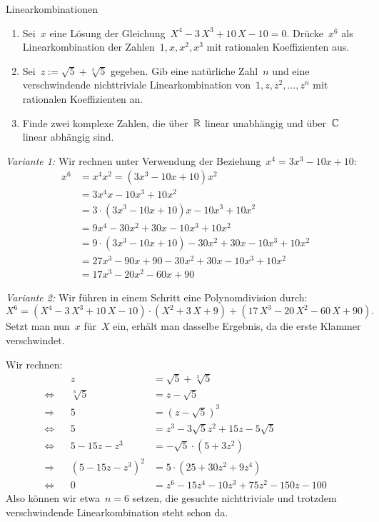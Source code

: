 \documentclass{algblatt}
\begin{document}
\vspace*{-1.5cm}

\begin{aufgabe}{Linearkombinationen}
\begin{enumerate}
\item Sei~$x$ eine Lösung der Gleichung~$X^4-3\,X^3+10\,X-10=0$. Drücke~$x^6$
als Linearkombination der Zahlen~$1,x,x^2,x^3$ mit rationalen Koeffizienten
aus.
\item Sei~$z := \sqrt{5} + \sqrt[3]{5}$ gegeben. Gib eine
natürliche Zahl~$n$ und eine verschwindende nichttriviale Linearkombination
von~$1,z,z^2,\ldots,z^n$ mit rationalen Koeffizienten an.
\item Finde zwei komplexe Zahlen, die über~$\mathbb{R}$ linear unabhängig und
über~$\mathbb{C}$ linear abhängig sind.
\end{enumerate}

\begin{loesungE}
\item \emph{Variante 1:} Wir rechnen unter Verwendung der Beziehung~$x^4 = 3x^3
- 10x + 10$:
\begin{align*}
  x^6 &= x^4 x^2 = (3x^3 - 10x + 10) x^2 \\
  &= 3x^4 x - 10x^3 + 10x^2 \\
  &= 3 \cdot (3x^3 - 10x + 10)x - 10x^3 + 10x^2 \\
  &= 9x^4 - 30x^2 + 30x - 10x^3 + 10x^2 \\
  &= 9 \cdot (3x^3 - 10x + 10) - 30x^2 + 30x - 10x^3 + 10x^2 \\
  &= 27x^3 - 90x + 90 - 30x^2 + 30x - 10x^3 + 10x^2 \\
  &= 17x^3 - 20x^2 - 60x + 90
\end{align*}

\emph{Variante 2:} Wir führen in einem Schritt eine Polynomdivision durch:
\[ X^6 = (X^4-3\,X^3+10\,X-10) \cdot (X^2 + 3\,X + 9) + (17\,X^3 - 20\,X^2 -
60\,X + 90). \]
Setzt man nun~$x$ für~$X$ ein, erhält man dasselbe Ergebnis, da die erste
Klammer verschwindet.

\item Wir rechnen:
\begin{align*}
  && z &= \sqrt{5} + \sqrt[3]{5} \\
  \Longleftrightarrow && \sqrt[3]{5} &= z - \sqrt{5} \\
  \Longrightarrow && 5 &= (z - \sqrt{5})^3 \\
  \Longleftrightarrow && 5 &= z^3 - 3\sqrt{5}z^2 + 15z - 5\sqrt{5} \\
  \Longleftrightarrow && 5-15z-z^3 &= -\sqrt{5} \cdot (5 + 3z^2) \\
  \Longrightarrow && (5-15z-z^3)^2 &= 5 \cdot (25 + 30z^2 + 9z^4) \\
  \Longleftrightarrow && 0 &= z^6 - 15z^4 - 10z^3 + 75z^2 - 150z - 100 
\end{align*}
Also können wir etwa~$n = 6$ setzen, die gesuchte nichttriviale und trotzdem
verschwindende Linearkombination steht schon da.


\end{loesungE}
\end{aufgabe}
\end{document}
